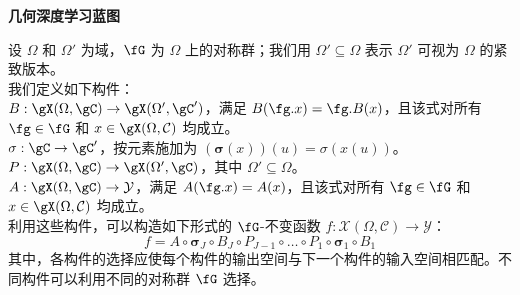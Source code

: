 \newpage
\begin{tcolorbox}[width=\linewidth,
                  boxsep=0pt,
                  left=7.5pt,
                  right=7.5pt,
                  top=4pt,
                  bottom=4pt,
                  arc=0pt,
                  boxrule=0pt,toprule=0pt,
                  colback=boxgray,
                  ]%
\small
\begin{center}
\textbf{几何深度学习蓝图}
\end{center}
设 $\Omega$ 和 $\Omega'$ 为域，$\fG$ 为 $\Omega$ 上的对称群；我们用 $\Omega' \subseteq \Omega$ 表示 $\Omega'$ 可视为 $\Omega$ 的紧致版本。\\

我们定义如下构件：\vspace{2mm}\\

     $B: \gX(\Omega, \gC) \to \gX( \Omega', \gC')$，满足 $B(\fg.x) = \fg.B(x)$，且该式对所有 $\fg \in \fG$ 和 $x\in \gX(\Omega,\mathcal{C})$ 均成立。\vspace{2mm}\\

     $\sigma: \gC \to \gC'$，按元素施加为 $(\bm{\sigma}(x))(u) = \sigma( x(u))$。\vspace{2mm}\\

     $P : \gX(\Omega, \gC) \rightarrow \gX(\Omega', \gC) $，其中 $\Omega'\subseteq\Omega$。\vspace{2mm}\\
    
     $A: \gX(\Omega, \gC) \rightarrow \mathcal{Y}$，满足 $A(\fg .x) = A(x)$，且该式对所有 $\fg \in \fG$ 和 $x\in \gX(\Omega,\mathcal{C})$ 均成立。\vspace{2mm}\\

利用这些构件，可以构造如下形式的 $\fG$-不变函数 $f:\mathcal{X}(\Omega,\mathcal{C}) \rightarrow \mathcal{Y}$：
$$
f = A \circ \boldsymbol{\sigma}_J \circ B_J \circ P_{J-1} \circ \hdots \circ P_1 \circ \boldsymbol{\sigma}_1 \circ B_1
$$
其中，各构件的选择应使每个构件的输出空间与下一个构件的输入空间相匹配。不同构件可以利用不同的对称群 $\fG$ 选择。
\end{tcolorbox}

%



